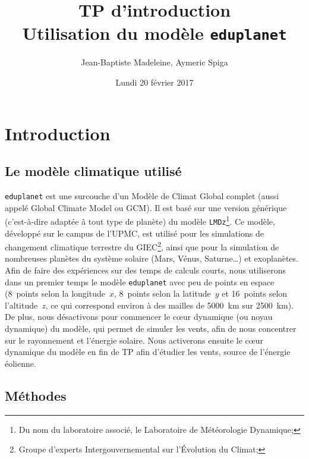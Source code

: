 \documentclass[a4paper,12pt]{article}
\begin{document}

\title{\textbf{TP d'introduction}\\
Utilisation du modèle \texttt{eduplanet}}
\author{\normalsize{Jean-Baptiste Madeleine, Aymeric Spiga}}
\date{Lundi 20 février 2017}

\maketitle

\renewcommand{\labelitemi}{\textbullet}

\section{Introduction}


\subsection{Le modèle climatique utilisé}

\texttt{eduplanet} est une surcouche d'un Modèle de Climat Global complet (aussi appelé
Global Climate Model ou GCM). Il est basé sur une version générique
(c'est-à-dire adaptée à tout type de planète) du modèle \texttt{LMDz}\footnote
{Du nom du laboratoire associé, le Laboratoire de Météorologie Dynamique;}. Ce
modèle, développé sur le campus de l'UPMC, est utilisé pour les simulations de
changement climatique terrestre du GIEC\footnote{Groupe d'experts
Intergouvernemental sur l'\'Evolution du Climat;}, ainsi que pour la simulation
de nombreuses planètes du système solaire (Mars, Vénus, Saturne\dots) et
exoplanètes. Afin de faire des expériences sur des temps de calculs courts,
nous utiliserons dans un premier temps le modèle \texttt{eduplanet} avec peu de
points en espace (8~points selon la longitude~$x$, 8~points selon la
latitude~$y$ et 16~points selon l'altitude~$z$, ce qui correspond environ à des
mailles de 5000~km sur 2500~km). De plus, nous désactivons pour commencer le
c\oe ur dynamique (ou noyau dynamique) du modèle, qui permet de simuler les
vents, afin de nous concentrer sur le rayonnement et l'énergie solaire. Nous
activerons ensuite le c\oe ur dynamique du modèle en fin de TP afin d'étudier
les vents, source de l'énergie éolienne.

\subsection{Méthodes}
\end{document}
